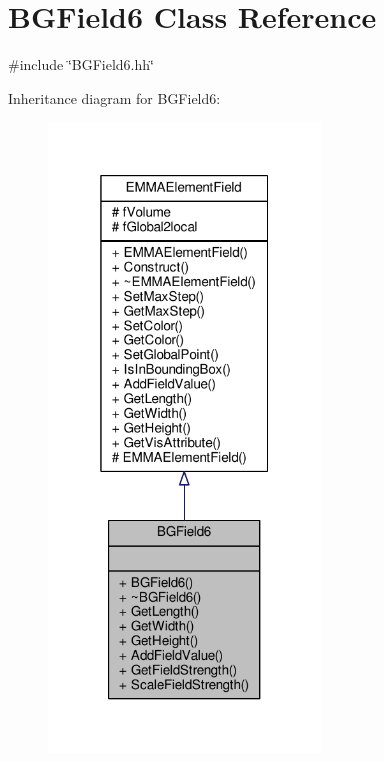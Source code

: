 \hypertarget{classBGField6}{}\section{B\+G\+Field6 Class Reference}
\label{classBGField6}


{\ttfamily \#include \char`\"{}B\+G\+Field6.\+hh\char`\"{}}



Inheritance diagram for B\+G\+Field6\+:
\nopagebreak
\begin{figure}[H]
\begin{center}
\leavevmode
\includegraphics[width=205pt]{classBGField6__inherit__graph}
\end{center}
\end{figure}



